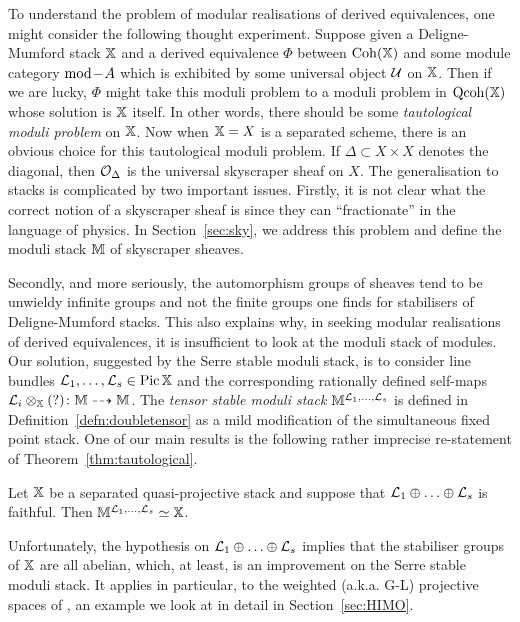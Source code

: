 \documentclass[12pt]{amsart}
\begin{document}
To understand the problem of modular realisations of derived equivalences, one might consider the following thought experiment. Suppose given a Deligne-Mumford stack $\mathbb{X}$ and a derived equivalence $\Phi$ between $\operatorname{Coh} (\mathbb{X})$ and some module category $\textup{mod}\!-\!A$ which is exhibited by some universal object $\mathcal{U}$ on $\mathbb{X}$. Then if we are lucky, $\Phi$ might take this moduli problem to a moduli problem in $\operatorname{Qcoh} (\mathbb{X})$ whose solution is $\mathbb{X}$ itself. In other words, there should be some {\em tautological moduli problem} on $\mathbb{X}$. Now when $\mathbb{X}=X$ is a separated scheme, there is an obvious choice for this tautological moduli problem. If $\Delta \subset X \times X$ denotes the diagonal, then $\mathcal{O}_{\Delta}$ is the universal skyscraper sheaf on $X$. The generalisation to stacks is complicated by two important issues. Firstly, it is not clear what the correct notion of a skyscraper sheaf is since they can ``fractionate'' in the language of physics. In Section~\ref{sec:sky}, we address this problem and define the moduli stack $\mathbb{M}$ of skyscraper sheaves. 

Secondly, and more seriously, the automorphism groups of sheaves tend to be unwieldy infinite groups and not the finite groups one finds for  stabilisers of Deligne-Mumford stacks. This also explains why, in seeking modular realisations of derived equivalences, it is insufficient to look at the moduli stack of modules. Our solution, suggested by the Serre stable moduli stack, is to consider line bundles $\mathcal{L}_1,\ldots, \mathcal{L}_s \in \operatorname{Pic} \mathbb{X}$ and the corresponding rationally defined self-maps $\mathcal{L}_i \otimes_{\mathbb{X}} (?) \colon \mathbb{M} \dashrightarrow \mathbb{M}$. The {\em tensor stable moduli stack} $\mathbb{M}^{\mathcal{L}_1,\ldots,\mathcal{L}_s}$ is defined in Definition~\ref{defn:doubletensor} as a mild modification of the simultaneous fixed point stack. One of our main results is the following rather imprecise re-statement of Theorem~\ref{thm:tautological}.

\begin{theorem}
Let $\mathbb{X}$ be a separated quasi-projective stack and suppose that $\mathcal{L}_1\oplus \ldots \oplus \mathcal{L}_s$ is faithful. Then $\mathbb{M}^{\mathcal{L}_1,\ldots,\mathcal{L}_s} \simeq \mathbb{X}$.
\end{theorem}
Unfortunately, the hypothesis on $\mathcal{L}_1\oplus \ldots \oplus\mathcal{L}_s$ implies that the stabiliser groups of $\mathbb{X}$ are all abelian, which, at least, is an improvement on the Serre stable moduli stack. It applies in particular, to the weighted (a.k.a. G-L) projective spaces of \cite{HIMO}, an example we look at in detail in Section~\ref{sec:HIMO}. 
\end{document}
